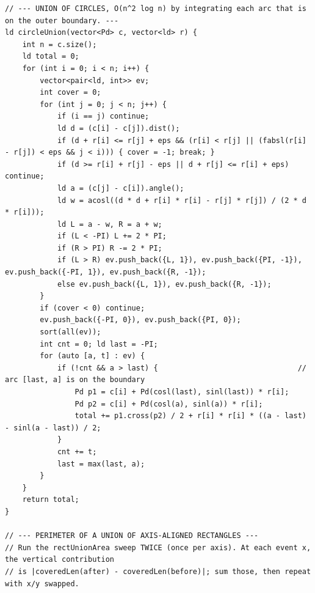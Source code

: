 \documentclass[9pt,a4paper,twocolumn]{extarticle}
\begin{document}
\begin{lstlisting}
// --- UNION OF CIRCLES, O(n^2 log n) by integrating each arc that is on the outer boundary. ---
ld circleUnion(vector<Pd> c, vector<ld> r) {
    int n = c.size();
    ld total = 0;
    for (int i = 0; i < n; i++) {
        vector<pair<ld, int>> ev;
        int cover = 0;
        for (int j = 0; j < n; j++) {
            if (i == j) continue;
            ld d = (c[i] - c[j]).dist();
            if (d + r[i] <= r[j] + eps && (r[i] < r[j] || (fabsl(r[i] - r[j]) < eps && j < i))) { cover = -1; break; }
            if (d >= r[i] + r[j] - eps || d + r[j] <= r[i] + eps) continue;
            ld a = (c[j] - c[i]).angle();
            ld w = acosl((d * d + r[i] * r[i] - r[j] * r[j]) / (2 * d * r[i]));
            ld L = a - w, R = a + w;
            if (L < -PI) L += 2 * PI;
            if (R > PI) R -= 2 * PI;
            if (L > R) ev.push_back({L, 1}), ev.push_back({PI, -1}), ev.push_back({-PI, 1}), ev.push_back({R, -1});
            else ev.push_back({L, 1}), ev.push_back({R, -1});
        }
        if (cover < 0) continue;
        ev.push_back({-PI, 0}), ev.push_back({PI, 0});
        sort(all(ev));
        int cnt = 0; ld last = -PI;
        for (auto [a, t] : ev) {
            if (!cnt && a > last) {                                // arc [last, a] is on the boundary
                Pd p1 = c[i] + Pd(cosl(last), sinl(last)) * r[i];
                Pd p2 = c[i] + Pd(cosl(a), sinl(a)) * r[i];
                total += p1.cross(p2) / 2 + r[i] * r[i] * ((a - last) - sinl(a - last)) / 2;
            }
            cnt += t;
            last = max(last, a);
        }
    }
    return total;
}

// --- PERIMETER OF A UNION OF AXIS-ALIGNED RECTANGLES ---
// Run the rectUnionArea sweep TWICE (once per axis). At each event x, the vertical contribution
// is |coveredLen(after) - coveredLen(before)|; sum those, then repeat with x/y swapped.
\end{lstlisting}

\filbreak
\end{document}
